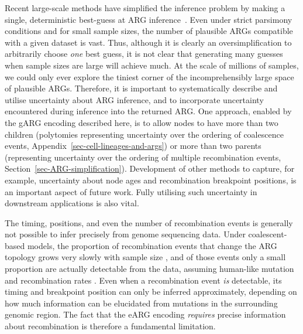 \documentclass{article}
\begin{document}
Recent large-scale methods have simplified the inference problem by
making a single, deterministic best-guess at ARG
inference~\citep{kelleher2019inferring,speidel2019method,zhan2023towards}.
Even under strict parsimony conditions and for small sample sizes, the
number of plausible ARGs compatible with a given dataset is vast.
Thus, although it is clearly an oversimplification to arbitrarily
choose \emph{one} best guess,
it is not clear that generating many guesses
when sample sizes are large will achieve much.
At the scale of millions of samples,
we could only ever explore the tiniest corner of the incomprehensibly
large space of plausible ARGs.
Therefore, it is important to systematically
describe and utilise uncertainty about ARG inference, and to
incorporate uncertainty encountered during inference into the returned ARG.
One approach, enabled by the gARG encoding described here, is to allow
nodes to have more than two children (polytomies
representing uncertainty over the ordering of coalescence events, Appendix~\ref{sec-cell-lineages-and-args}) or
more than two parents (representing uncertainty over the ordering
of multiple recombination events, Section~\ref{sec-ARG-simplification}). Development of other methods to capture, for example,
uncertainty about node ages and recombination breakpoint positions, is an important
aspect of future work.
Fully utilising such uncertainty in downstream
applications is also vital.

The timing, positions, and even the number of recombination events is generally
not possible to infer precisely from genome sequencing data. Under
coalescent-based models, the proportion of recombination events that change the
ARG topology grows very slowly with sample size \citep{hein2004gene}, and of those
events only a small proportion are actually detectable from the data, assuming
human-like mutation and recombination
rates \citep{myers2002detection,hayman2023recoverability}.
Even when a recombination event \emph{is} detectable, its timing and breakpoint
position can only be inferred approximately, depending on how much information
can be elucidated from mutations in the surrounding genomic region.
The fact that the eARG encoding \emph{requires}
precise information about recombination is therefore a fundamental limitation.
\end{document}

